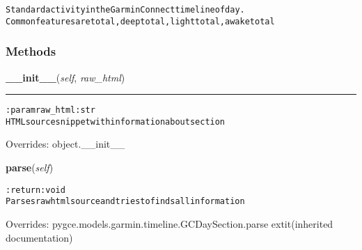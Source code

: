\begin{alltt}

Standard activity in the Garmin Connect timeline of day.
Common features are total, deep total, light total, awake total
\end{alltt}



  \subsubsection{Methods}

    \vspace{0.5ex}

\hspace{.8\funcindent}\begin{boxedminipage}{\funcwidth}

    \raggedright \textbf{\_\_init\_\_}(\textit{self}, \textit{raw\_html})

    \vspace{-1.5ex}

    \rule{\textwidth}{0.5\fboxrule}
\setlength{\parskip}{2ex}
\begin{alltt}

:param raw\_html: str
    HTML source snippet with information about section
\end{alltt}

\setlength{\parskip}{1ex}
      Overrides: object.\_\_init\_\_

    \end{boxedminipage}

    \vspace{0.5ex}

\hspace{.8\funcindent}\begin{boxedminipage}{\funcwidth}

    \raggedright \textbf{parse}(\textit{self})

\setlength{\parskip}{2ex}
\begin{alltt}

:return: void
    Parses raw html source and tries to finds all information
\end{alltt}

\setlength{\parskip}{1ex}
      Overrides: pygce.models.garmin.timeline.GCDaySection.parse 	extit{(inherited documentation)}

    \end{boxedminipage}

